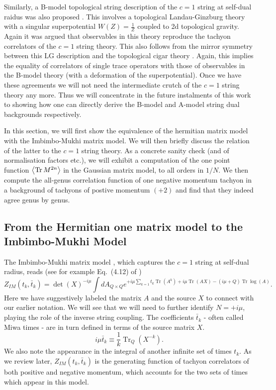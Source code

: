 \documentclass[english]{article}
\DeclareMathOperator{\Tr}{Tr}
\begin{document}
Similarly, a B-model topological string description of the $c=1$ string at self-dual raidus was also proposed \cite{ghoshalMukhiLG, hananyOzPlLG}. This involves a topological Landau-Ginzburg theory with a singular superpotential $W(Z)=\frac{1}{Z}$ coupled to 2d topological gravity. Again it was argued that observables in this theory reproduce the tachyon correlators of the $c=1$ string theory. This also follows from the mirror symmetry between this LG description and the topological cigar theory
\cite{hori2001duality}. Again, this implies the equality of correlators of single trace operators with those of observables in the B-model theory (with a deformation of the superpotential). 
Once we have these agreements we will not need the intermediate crutch of the $c=1$ string theory any more. Thus we will concentrate in the future instalments of this work \cite{DSDII, DSDIII} to showing how one can directly derive the B-model and A-model string dual backgrounds respectively. 

In this section, we will first show the equivalence of the hermitian matrix model with the Imbimbo-Mukhi matrix model. We will then briefly discuss the relation of the latter to the $c=1$ string theory. As a concrete sanity check (and of normalisation factors etc.), we will exhibit a computation of the one point function $\Braket{\Tr M^{2n}}$ in the Gaussian matrix model, to all orders in $1/N$. We then compute the all-genus correlation function of one negative momentum tachyon in a background of tachyons of postive momentum $(+2)$ and find that they indeed agree genus by genus. 

\subsection{From the Hermitian one matrix model to the Imbimbo-Mukhi Model}

The  Imbimbo-Mukhi matrix model \cite{ImbimboMukhi}, which captures the $c=1$ string at self-dual radius, reads (see for example Eq.~(4.12) of \cite{mukhireview})
\begin{equation}\label{eq:IMpartfn}
    Z_{IM}(t_k,\bar{t}_k)= \det(X)^{-i \mu} \int dA_{Q \times Q} e^{+ i\mu \sum_{k=1} t_{k} \Tr (A^{k})  + i \mu \Tr (A X)  - (i \mu + Q) \Tr \log(A) }.
\end{equation} 
Here we have suggestively labeled the matrix $A$ and the source $X$ to connect with our earlier notation. We will see that we will need to further identify $N=+ i\mu$, playing the role of the inverse string coupling. The coefficients $\bar{t}_k$ - often called Miwa times  - are in turn defined in terms of the source matrix $X$.
\begin{equation} \label{eq:bartimes}
    i\mu \bar{t}_k \equiv \frac{1}{k} \Tr_{Q} \left( X^{-k}\right).
\end{equation}
We also note the appearance in the integral of another infinite set of times $t_k$. As we review later, $Z_{IM}(t_k,\bar{t}_k)$ is the generating function of tachyon correlators of both positive and negative momentum, which accounts for the two sets of times which appear in this model. 
\end{document}
